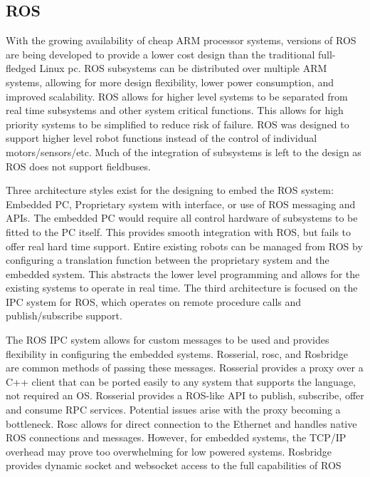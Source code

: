 \subsection{ROS}

With the growing availability of cheap ARM processor systems, versions of ROS are being developed to provide a lower cost design than the traditional full-fledged Linux pc. ROS subsystems can be distributed over multiple ARM systems, allowing for more design flexibility, lower power consumption, and improved scalability. ROS allows for higher level systems to be separated from real time subsystems and other system critical functions. This allows for high priority systems to be simplified to reduce risk of failure. ROS was designed to support higher level robot functions instead of the control of individual motors/sensors/etc. Much of the integration of subsystems is left to the design as ROS does not support fieldbuses. 

Three architecture styles exist for the designing to embed the ROS system: Embedded PC, Proprietary system with interface, or use of ROS messaging and APIs. The embedded PC would require all control hardware of subsystems to be fitted to the PC itself. This provides smooth integration with ROS, but fails to offer real hard time support. Entire existing robots can be managed from ROS by configuring a translation function between the proprietary system and the embedded system. This abstracts the lower level programming and allows for the existing systems to operate in real time. The third architecture is focused on the IPC system for ROS, which operates on remote procedure calls and publish/subscribe support. 

The ROS IPC system allows for custom messages to be used and provides flexibility in configuring the embedded systems. Rosserial, rosc, and Rosbridge are common methods of passing these messages. Rosserial provides a proxy over a C++ client that can be ported easily to any system that supports the language, not required an OS. Rosserial provides a ROS-like API to publish, subscribe, offer and consume RPC services. Potential issues arise with the proxy becoming a bottleneck. Rosc allows for direct connection to the Ethernet and handles native ROS connections and messages. However, for embedded systems, the TCP/IP overhead may prove too overwhelming for low powered systems. Rosbridge provides dynamic socket and websocket access to the full capabilities of ROS


